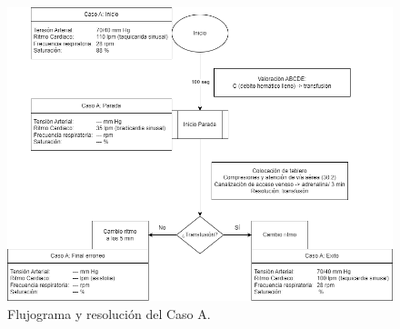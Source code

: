 \begin{figure}[hptb]
    \centering
	\includegraphics[width=\linewidth]{./imagenes/ACV-AdSC-CasosUCI_CasoA.png}
	\caption{\label{fig:Brusilov:SVI:CasoA}Flujograma y resolución del Caso A.}
\end{figure}


